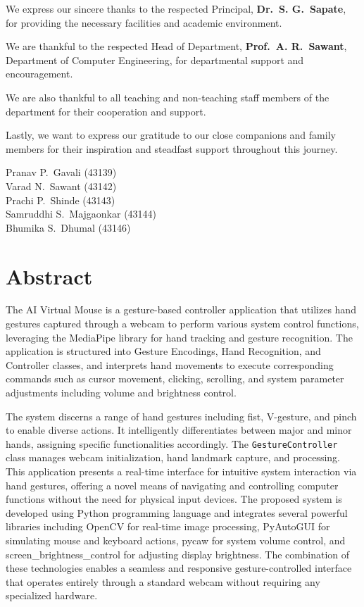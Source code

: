\documentclass[12pt,a4paper]{report}
\newcommand\RemoveWatermark{
\ClearShipoutPictureBG
}
\begin{document}
We express our sincere thanks to the respected Principal, \textbf{Dr.\ S. G.\ Sapate}, for
providing the necessary facilities and academic environment.

We are thankful to the respected Head of Department, \textbf{Prof.\ A. R.\ Sawant}, Department
of Computer Engineering, for departmental support and encouragement.

We are also thankful to all teaching and non-teaching staff members of the department for their
cooperation and support.

Lastly, we want to express our gratitude to our close companions and family members for their
inspiration and steadfast support throughout this journey.

\vspace{1cm}
\begin{flushright}
  Pranav P.\ Gavali (43139)\\
  Varad N.\ Sawant (43142)\\
  Prachi P.\ Shinde (43143)\\
  Samruddhi S.\ Majgaonkar (43144)\\
  Bhumika S.\ Dhumal (43146)
\end{flushright}

\RemoveWatermark

\clearpage
\chapter*{Abstract}

The AI Virtual Mouse is a gesture-based controller application that utilizes hand gestures
captured through a webcam to perform various system control functions, leveraging the
MediaPipe library for hand tracking and gesture recognition. The application is
structured into Gesture Encodings, Hand Recognition, and Controller
classes, and interprets hand movements to execute corresponding commands such as cursor
movement, clicking, scrolling, and system parameter adjustments including volume and
brightness control.

The system discerns a range of hand gestures including fist, V-gesture, and pinch to enable
diverse actions. It intelligently differentiates between major and minor hands, assigning
specific functionalities accordingly. The \texttt{GestureController} class manages webcam
initialization, hand landmark capture, and processing. This application presents a real-time
interface for intuitive system interaction via hand gestures, offering a novel means of
navigating and controlling computer functions without the need for physical input devices.
The proposed system is developed using Python programming language and integrates
several powerful libraries including OpenCV for real-time image processing,
PyAutoGUI for simulating mouse and keyboard actions, pycaw for
system volume control, and screen\_brightness\_control for adjusting display
brightness. The combination of these technologies enables a seamless and responsive
gesture-controlled interface that operates entirely through a standard webcam without
requiring any specialized hardware.
\end{document}
